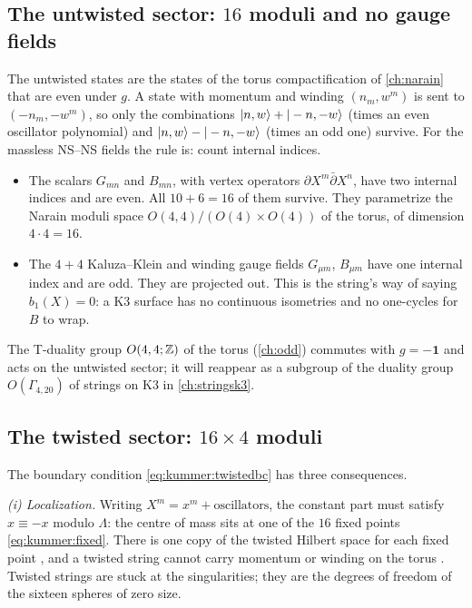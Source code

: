 \subsection{The untwisted sector: \texorpdfstring{$16$}{16} moduli and no gauge fields}

The untwisted states are the states of the torus compactification of \cref{ch:narain} that
are even under $g$. A state with momentum and winding $(n_m,w^m)$ is sent to
$(-n_m,-w^m)$, so only the combinations $|n,w\rangle+|-n,-w\rangle$ (times an even oscillator
polynomial) and $|n,w\rangle-|-n,-w\rangle$ (times an odd one) survive. For the massless
NS--NS fields the rule is: count internal indices.
\begin{itemize}[leftmargin=*,itemsep=2pt]
\item The scalars $G_{mn}$ and $B_{mn}$, with vertex operators
$\partial X^m\bar\partial X^n$, have two internal indices and are even. All
$10+6=16$ of them survive. They parametrize the Narain moduli space
$O(4,4)/(O(4)\times O(4))$ of the torus, of dimension $4\cdot4=16$.
\item The $4+4$ Kaluza--Klein and winding gauge fields $G_{\mu m}$, $B_{\mu m}$ have one
internal index and are odd. They are projected out. This is the string's way of saying
$b_1(X)=0$: a K3 surface has no continuous isometries and no one-cycles for $B$ to wrap.
\end{itemize}
The T-duality group $O(4,4;\mathbb{Z})$ of the torus (\cref{ch:odd}) commutes with $g=-\mathbf 1$ and
acts on the untwisted sector; it will reappear as a subgroup of the duality group
$O(\Gamma_{4,20})$ of strings on K3 in \cref{ch:stringsk3}.

\subsection{The twisted sector: \texorpdfstring{$16\times4$}{16 x 4} moduli}

The boundary condition \eqref{eq:kummer:twistedbc} has three consequences.

\emph{(i) Localization.} Writing $X^m=x^m+\text{oscillators}$, the constant part must
satisfy $x\equiv-x$ modulo $\Lambda$: the centre of mass sits at one of the $16$ fixed points
\eqref{eq:kummer:fixed}. There is one copy of the twisted Hilbert space for each fixed point
, and a twisted string cannot carry momentum or winding on the
torus . Twisted strings are stuck at the singularities; they are
the degrees of freedom of the sixteen spheres of zero size.

